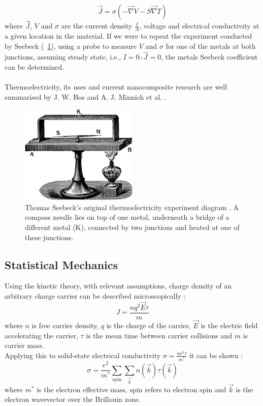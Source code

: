 \documentclass[a4paper,10pt,journal]{IEEEtran}
\newcommand{\figref}[2][\figurename~]{#1\ref{#2}}
\begin{document}
\begin{equation}
\label{current-density}
	\vec{J} = \sigma (-\vec{\nabla} V - S \vec{\nabla} T)
\end{equation}
where $\vec{J}$, $V$ and $\sigma$ are the current density $\frac{I}{A}$,
voltage and electrical conductivity at a given location in the
material. If we were to repeat the experiment conducted by Seebeck
(\figref{seebeck-experiment}), using a probe to measure $V$ and
$\sigma$ for one of the metals at both junctions, assuming steady state,
i.e., $I=0 \therefore \vec{J} = 0$, the metals Seebeck coefficient can be
determined.\\\\
Thermoelectricity, its uses and current nanocomposite research are well
summarised by J. W. Bos \cite{bos-review} and A. J. Minnich et al.
\cite{minnich-review}.

\begin{figure}
	\centering
	\includegraphics[width=0.5\textwidth]{seebeck-experiment-black.png}
	\caption{Thomas Seebeck's original thermoelectricity experiment
	diagram \cite{seebeck-original}. A compass needle lies on top of
	one metal, underneath a bridge of a different metal (K), connected
	by two junctions and heated at one of these junctions.}
	\label{seebeck-experiment}
\end{figure}

\subsection{Statistical Mechanics}
Using the kinetic theory, with relevant assumptions, charge density of
an arbitrary charge carrier can be described microscopically \cite{kittel}:
\begin{equation}
\label{charge-density}
	J = \frac{nq^2\vec{E} \tau}{m}
\end{equation}
where $n$ is free carrier density, $q$ is the charge of the
carrier, $\vec{E}$ is the electric field accelerating the
carrier, $\tau$ is the mean time between carrier collisions and $m$ is
carrier mass.\\
Applying this to solid-state electrical conductivity $\sigma = \frac{ne^2
\tau}{m^*}$ it can be shown \cite{ziman}:
\begin{equation}
\label{micro-elec}
	\sigma = \frac{e^2}{m^*} \sum_{\mathrm{spin}} \sum_{\vec{k}}
	n(\vec{k}) \tau(\vec{k})
\end{equation}
where $m^*$ is the electron effective mass, $\mathrm{spin}$ refers to
electron spin and $\vec{k}$ is the electron wavevector over the
Brillouin zone.
\end{document}
